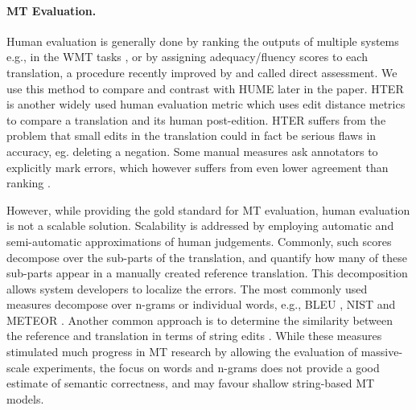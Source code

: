 \documentclass[11pt,letterpaper]{article}
\def\perscite#1{\newcite{#1}}
\def\parcite#1{\cite{#1}}
\begin{document}
\paragraph{MT Evaluation.}
Human evaluation is generally done by ranking the outputs of multiple systems
e.g., in the WMT tasks \parcite{bojar2015findings}, or by assigning
adequacy/fluency scores to each translation, a procedure recently improved
by \perscite{graham2015accurate} and called direct assessment. We use this method to compare and contrast
with HUME later in the paper. HTER~\parcite{snover2006study} is another widely used human evaluation metric
which uses edit distance metrics to compare a translation and its human 
post-edition. HTER suffers from the problem that small edits in the translation
could in fact be serious flaws in accuracy, eg. deleting a negation. 
Some manual measures ask annotators to explicitly mark errors, which however
suffers from even lower agreement than ranking \parcite{lommel:etal:mqm-iaa:2014}.

However, while providing the gold standard for MT evaluation, human evaluation
is not a scalable solution.
Scalability is addressed by employing automatic and semi-automatic approximations of human
judgements. Commonly, such scores decompose over the sub-parts of
the translation, and quantify how many of these sub-parts appear in a manually
created reference translation.
This decomposition allows system developers to localize the errors.
The most commonly used measures decompose over n-grams or individual words, e.g., 
BLEU \parcite{Papineni:2002}, NIST \parcite{Doddington:2002} and METEOR \parcite{Banerjee:2005}.
Another common approach is to determine the similarity between the reference and translation
in terms of string edits \parcite{snover2006study}.
While these measures stimulated much progress in MT research by allowing
the evaluation of massive-scale experiments, the focus on words and n-grams does
not provide a good estimate of semantic correctness, and may favour shallow string-based
MT models.


\end{document}
